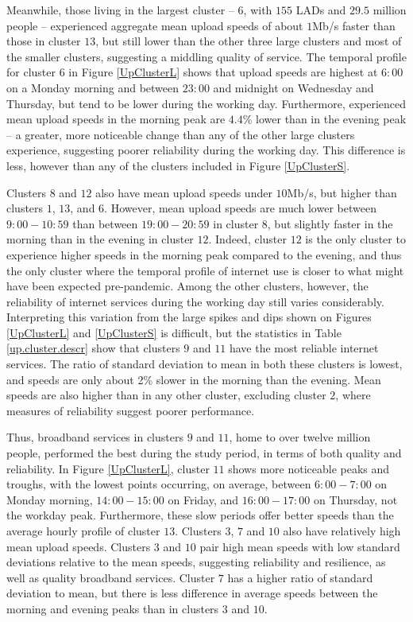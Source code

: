 \documentclass[Royal,times,sageh]{sagej}
\begin{document}
Meanwhile, those living in the largest cluster -- \(6\), with \(155\)
LADs and \(29.5\) million people -- experienced aggregate mean upload
speeds of about \(1\)Mb/s faster than those in cluster \(13\), but still
lower than the other three large clusters and most of the smaller
clusters, suggesting a middling quality of service. The temporal profile
for cluster \(6\) in Figure \ref{UpClusterL} shows that upload speeds
are highest at \(6:00\) on a Monday morning and between \(23:00\) and
midnight on Wednesday and Thursday, but tend to be lower during the
working day. Furthermore, experienced mean upload speeds in the morning
peak are \(4.4\)\% lower than in the evening peak -- a greater, more
noticeable change than any of the other large clusters experience,
suggesting poorer reliability during the working day. This difference is
less, however than any of the clusters included in Figure
\ref{UpClusterS}.

Clusters \(8\) and \(12\) also have mean upload speeds under \(10\)Mb/s,
but higher than clusters \(1\), \(13\), and \(6\). However, mean upload
speeds are much lower between \(9:00-10:59\) than between
\(19:00-20:59\) in cluster \(8\), but slightly faster in the morning
than in the evening in cluster \(12\). Indeed, cluster \(12\) is the
only cluster to experience higher speeds in the morning peak compared to
the evening, and thus the only cluster where the temporal profile of
internet use is closer to what might have been expected pre-pandemic.
Among the other clusters, however, the reliability of internet services
during the working day still varies considerably. Interpreting this
variation from the large spikes and dips shown on Figures
\ref{UpClusterL} and \ref{UpClusterS} is difficult, but the statistics
in Table \ref{up.cluster.descr} show that clusters \(9\) and \(11\) have
the most reliable internet services. The ratio of standard deviation to
mean in both these clusters is lowest, and speeds are only about 2\%
slower in the morning than the evening. Mean speeds are also higher than
in any other cluster, excluding cluster \(2\), where measures of
reliability suggest poorer performance.

Thus, broadband services in clusters \(9\) and \(11\), home to over
twelve million people, performed the best during the study period, in
terms of both quality and reliability. In Figure \ref{UpClusterL},
cluster \(11\) shows more noticeable peaks and troughs, with the lowest
points occurring, on average, between \(6:00-7:00\) on Monday morning,
\(14:00-15:00\) on Friday, and \(16:00-17:00\) on Thursday, not the
workday peak. Furthermore, these slow periods offer better speeds than
the average hourly profile of cluster \(13\). Clusters \(3\), \(7\) and
\(10\) also have relatively high mean upload speeds. Clusters \(3\) and
\(10\) pair high mean speeds with low standard deviations relative to
the mean speeds, suggesting reliability and resilience, as well as
quality broadband services. Cluster \(7\) has a higher ratio of standard
deviation to mean, but there is less difference in average speeds
between the morning and evening peaks than in clusters \(3\) and \(10\).
\end{document}
